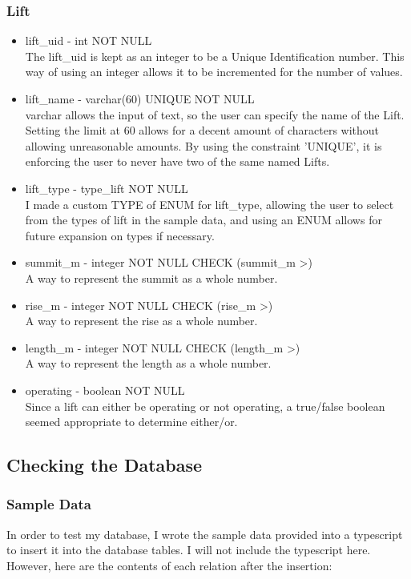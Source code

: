 \documentclass[11pt]{scrartcl} %
\begin{document}
\subsubsection{Lift}
\begin{itemize}
\item lift\_uid - int NOT NULL\\
The lift\_uid is kept as an integer to be a Unique Identification number. This way of using an integer allows it to be incremented for the number of values.
\item lift\_name - varchar(60) UNIQUE NOT NULL\\
varchar allows the input of text, so the user can specify the name of the Lift. Setting the limit at 60 allows for a decent amount of characters without allowing unreasonable amounts. By using the constraint 'UNIQUE', it is enforcing the user to never have two of the same named Lifts.
\item lift\_type - type\_lift NOT NULL\\
I made a custom TYPE of ENUM for lift\_type, allowing the user to select from the types of lift in the sample data, and using an ENUM allows for future expansion on types if necessary.
\item summit\_m - integer NOT NULL CHECK (summit\_m \textgreater {})\\
A way to represent the summit as a whole number.
\item rise\_m - integer NOT NULL CHECK (rise\_m \textgreater {})\\
A way to represent the rise as a whole number.
\item length\_m - integer NOT NULL CHECK (length\_m \textgreater {})\\
A way to represent the length as a whole number.
\item operating - boolean NOT NULL\\
Since a lift can either be operating or not operating, a true/false boolean seemed appropriate to determine either/or.
\end{itemize}

\newpage
\subsection{Checking the Database}
\subsubsection{Sample Data}
In order to test my database, I wrote the sample data provided into a typescript to insert it into the database tables. I will not include the typescript here. However, here are the contents of each relation after the insertion:
\end{document}
